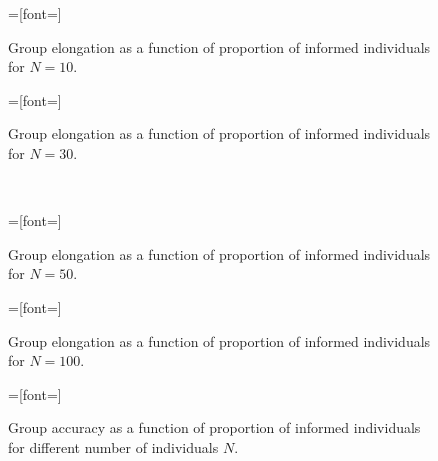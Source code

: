 
\setlength{}
\setlength{}

\begin{figure}[H]
{}=[font=\scriptsize]

\caption{Group elongation as a function of proportion of informed individuals for $N=10$.}
\label{fig:elong10}
\end{figure}

\begin{figure}[H]
{}=[font=\scriptsize]

\caption{Group elongation as a function of proportion of informed individuals for $N=30$.}
\label{fig:elong30}
\end{figure}
\vfill
\newpage
\ \\
\begin{figure}[H]
{}=[font=\scriptsize]

\caption{Group elongation as a function of proportion of informed individuals for $N=50$.}
\label{fig:elong50}
\end{figure}

\begin{figure}[H]
{}=[font=\scriptsize]

\caption{Group elongation as a function of proportion of informed individuals for $N=100$.}
\label{fig:elong100}
\end{figure}
\vfill
\newpage

\begin{figure}[H]
{}=[font=\scriptsize]

\caption{Group accuracy as a function of proportion of informed individuals for different number of individuals $N$.}
\label{fig:accuracy}
\end{figure}